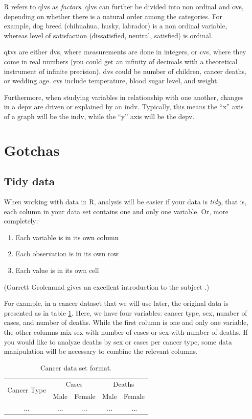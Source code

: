 \documentclass{report}
\begin{document}
	R refers to \glspl{qlv} as \emph{factors}. \Glspl{qlv} can further be divided into non ordinal and \glspl{ov}, depending on whether there is a natural order among the categories. For example, dog breed (chihuahua, husky, labrador) is a non ordinal variable, whereas level of satisfaction (dissatisfied, neutral, satisfied) is ordinal.
	
	\Glspl{qtv} are either \glspl{dv}, where measurements are done in integers, or \glspl{cv}, where they come in real numbers (you could get an infinity of decimals with a theoretical instrument of infinite precision). \Glspl{dv} could be number of children, cancer deaths, or wedding age. \Glspl{cv} include temperature, blood sugar level, and weight.
	
	Furthermore, when studying variables in relationship with one another, changes in a \gls{depv} are driven or explained by an \gls{indv}. Typically, this means the ``x'' axis of a graph will be the \gls{indv}, while the ``y'' axis will be the \gls{depv}.
	
	\section{Gotchas}
		\subsection{Tidy data}\label{subsec:gotcha_tidy}
		When working with data in R, analysis will be easier if your data is \emph{tidy}, that is, each column in your data set contains one and only one variable. Or, more completely:
		\begin{enumerate}
			\item Each variable is in its own column
			\item Each observation is in its own row
			\item Each value is in its own cell
		\end{enumerate}
		
		(Garrett Grolemund gives an excellent introduction to the subject \cite{tidy}.)
		
		For example, in a cancer dataset that we will use later, the original data is presented as in table \ref{table:cancer}. Here, we have four variables: cancer type, sex, number of cases, and number of deaths. While the first column is one and only one variable, the other columns mix sex with number of cases or sex with number of deaths. If you would like to analyze deaths by sex or cases per cancer type, some data manipulation will be necessary to combine the relevant columns.
		\begin{table}[h]
			\centering
			\begin{tabular}{|c|c|c|c|c|}
				\hline 
				\multirow{2}{*}{Cancer Type} & \multicolumn{2}{c|}{Cases}  & \multicolumn{2}{c|}{Deaths} \\ 
				& Male & Female & Male & Female \\  \hline 
				... &  ... & ...  & ...  & ...  \\ \hline 
			\end{tabular} 
			\caption{Cancer data set format.}
			\label{table:cancer}
		\end{table}
\end{document}
